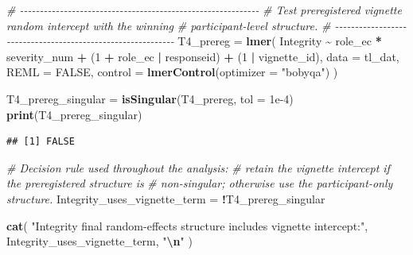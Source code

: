 \documentclass[
]{article}
\newenvironment{Shaded}{\begin{snugshade}}{\end{snugshade}}
\newcommand{\AttributeTok}[1]{\textcolor[rgb]{0.13,0.29,0.53}{#1}}
\newcommand{\CommentTok}[1]{\textcolor[rgb]{0.56,0.35,0.01}{\textit{#1}}}
\newcommand{\ConstantTok}[1]{\textcolor[rgb]{0.56,0.35,0.01}{#1}}
\newcommand{\DecValTok}[1]{\textcolor[rgb]{0.00,0.00,0.81}{#1}}
\newcommand{\FloatTok}[1]{\textcolor[rgb]{0.00,0.00,0.81}{#1}}
\newcommand{\FunctionTok}[1]{\textcolor[rgb]{0.13,0.29,0.53}{\textbf{#1}}}
\newcommand{\NormalTok}[1]{#1}
\newcommand{\OtherTok}[1]{\textcolor[rgb]{0.56,0.35,0.01}{#1}}
\newcommand{\SpecialCharTok}[1]{\textcolor[rgb]{0.81,0.36,0.00}{\textbf{#1}}}
\newcommand{\StringTok}[1]{\textcolor[rgb]{0.31,0.60,0.02}{#1}}
\begin{document}
\begin{Shaded}
\begin{Highlighting}[]
\CommentTok{\# {-}{-}{-}{-}{-}{-}{-}{-}{-}{-}{-}{-}{-}{-}{-}{-}{-}{-}{-}{-}{-}{-}{-}{-}{-}{-}{-}{-}{-}{-}{-}{-}{-}{-}{-}{-}{-}{-}{-}{-}{-}{-}{-}{-}{-}{-}{-}{-}{-}{-}{-}{-}{-}{-}{-}{-}{-}{-}{-}{-}}
\CommentTok{\# Test preregistered vignette random intercept with the winning}
\CommentTok{\# participant{-}level structure.}
\CommentTok{\# {-}{-}{-}{-}{-}{-}{-}{-}{-}{-}{-}{-}{-}{-}{-}{-}{-}{-}{-}{-}{-}{-}{-}{-}{-}{-}{-}{-}{-}{-}{-}{-}{-}{-}{-}{-}{-}{-}{-}{-}{-}{-}{-}{-}{-}{-}{-}{-}{-}{-}{-}{-}{-}{-}{-}{-}{-}{-}{-}{-}}
\NormalTok{T4\_prereg }\OtherTok{=} \FunctionTok{lmer}\NormalTok{(}
\NormalTok{  Integrity }\SpecialCharTok{\textasciitilde{}}\NormalTok{ role\_ec }\SpecialCharTok{*}\NormalTok{ severity\_num }\SpecialCharTok{+}
\NormalTok{    (}\DecValTok{1} \SpecialCharTok{+}\NormalTok{ role\_ec }\SpecialCharTok{|}\NormalTok{ responseid) }\SpecialCharTok{+}
\NormalTok{    (}\DecValTok{1} \SpecialCharTok{|}\NormalTok{ vignette\_id),}
  \AttributeTok{data =}\NormalTok{ tl\_dat,}
  \AttributeTok{REML =} \ConstantTok{FALSE}\NormalTok{,}
  \AttributeTok{control =} \FunctionTok{lmerControl}\NormalTok{(}\AttributeTok{optimizer =} \StringTok{"bobyqa"}\NormalTok{)}
\NormalTok{)}

\NormalTok{T4\_prereg\_singular }\OtherTok{=} \FunctionTok{isSingular}\NormalTok{(T4\_prereg, }\AttributeTok{tol =} \FloatTok{1e{-}4}\NormalTok{)}
\FunctionTok{print}\NormalTok{(T4\_prereg\_singular)}
\end{Highlighting}
\end{Shaded}

\begin{verbatim}
## [1] FALSE
\end{verbatim}

\begin{Shaded}
\begin{Highlighting}[]
\CommentTok{\# Decision rule used throughout the analysis:}
\CommentTok{\# retain the vignette intercept if the preregistered structure is}
\CommentTok{\# non{-}singular; otherwise use the participant{-}only structure.}
\NormalTok{Integrity\_uses\_vignette\_term }\OtherTok{=} \SpecialCharTok{!}\NormalTok{T4\_prereg\_singular}

\FunctionTok{cat}\NormalTok{(}
  \StringTok{"Integrity final random{-}effects structure includes vignette intercept:"}\NormalTok{,}
\NormalTok{  Integrity\_uses\_vignette\_term,}
  \StringTok{"}\SpecialCharTok{\textbackslash{}n}\StringTok{"}
\NormalTok{)}
\end{Highlighting}
\end{Shaded}
\end{document}
